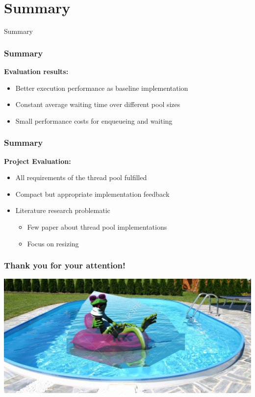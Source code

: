 \documentclass{beamer}
\begin{document}
\section{Summary}
\begin{frame}
	\begin{center}
		\huge Summary
	\end{center}
\end{frame}

\begin{frame}
	\frametitle{Summary}
	\textbf{Evaluation results:}
	\begin{itemize}
		\item Better execution performance as baseline implementation
		\item Constant average waiting time over different pool sizes
		\item Small performance costs for enqueueing and waiting
	\end{itemize}
\end{frame}

\begin{frame}
\frametitle{Summary}
	\textbf{Project Evaluation:}
	\begin{itemize}
		\item All requirements of the thread pool fulfilled
		\item Compact but appropriate implementation feedback
		\item Literature research problematic 
		\begin{itemize}
			\item Few paper about thread pool implementations
			\item Focus on resizing
		\end{itemize}
	\end{itemize}
\end{frame}




\begin{frame}
    \frametitle{Thank you for your attention!}
 	\includegraphics[width=\textwidth]{img/important.jpg}
\end{frame}
\end{document}
